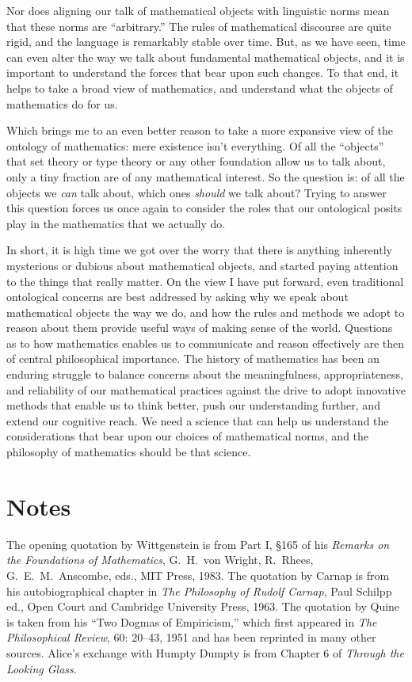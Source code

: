 \documentclass[12pt]{article}
\begin{document}
Nor does aligning our talk of mathematical objects with linguistic norms mean that these norms are ``arbitrary.'' The rules of mathematical discourse are quite rigid, and the language is remarkably stable over time. But, as we have seen, time can even alter the way we talk about fundamental mathematical objects, and it is important to understand the forces that bear upon such changes. To that end, it helps to take a broad view of mathematics, and understand what the objects of mathematics do for us.

Which brings me to an even better reason to take a more expansive view of the ontology of mathematics: mere existence isn't everything. Of all the ``objects'' that set theory or type theory or any other foundation allow us to talk about, only a tiny fraction are of any mathematical interest. So the question is: of all the objects we \emph{can} talk about, which ones \emph{should} we talk about? Trying to answer this question forces us once again to consider the roles that our ontological posits play in the mathematics that we actually do.

In short, it is high time we got over the worry that there is anything inherently mysterious or dubious about mathematical objects, and started paying attention to the things that really matter. On the view I have put forward, even traditional ontological concerns are best addressed by asking why we speak about mathematical objects the way we do, and how the rules and methods we adopt to reason about them provide useful ways of making sense of the world. Questions as to how mathematics enables us to communicate and reason effectively are then of central philosophical importance. The history of mathematics has been an enduring struggle to balance concerns about the meaningfulness, appropriateness, and reliability of our mathematical practices against the drive to adopt innovative methods that enable us to  think better, push our understanding further, and extend our cognitive reach. We need a science that can help us understand the considerations that bear upon our choices of mathematical norms, and the philosophy of mathematics should be that science.

\section*{Notes}

The opening quotation by Wittgenstein is from Part I, \S 165 of his \emph{Remarks on the Foundations of Mathematics}, G.~H.~von Wright, R.~Rhees, G.~E.~M.~Anscombe, eds., MIT Press, 1983. The quotation by Carnap is from his autobiographical chapter in \emph{The Philosophy of Rudolf Carnap}, Paul Schilpp ed., Open Court and Cambridge University Press, 1963. The quotation by Quine is taken from his ``Two Dogmas of Empiricism,'' which first appeared in \emph{The Philosophical Review}, 60: 20--43, 1951 and has been reprinted in many other sources. Alice's exchange with Humpty Dumpty is from Chapter 6 of \emph{Through the Looking Glass}.
\end{document}
